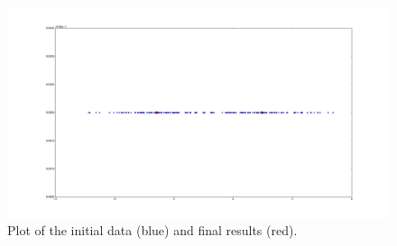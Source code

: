 \documentclass{article}
\begin{document}
\begin{enumerate}
\begin{enumerate}[label=(\alph*)]
                \begin{figure}[H]
                    \centering
                    \includegraphics[width=1.0\textwidth]{plot.png}
                    \caption{Plot of the initial data  (blue) and final results (red).}
                \end{figure}
        \end{enumerate}
\end{enumerate}

\end{document}
